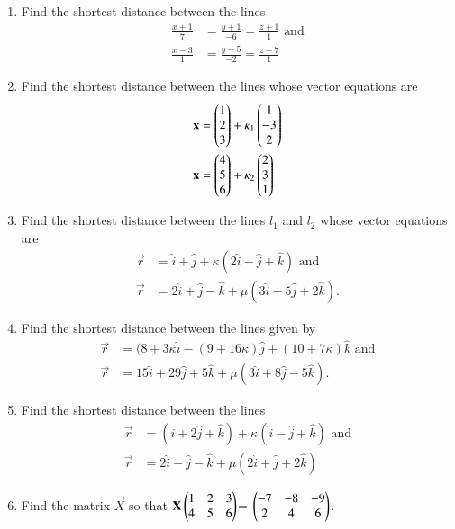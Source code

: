 \begin{enumerate}[label=\thesubsection.\arabic*,ref=\thesubsection.\theenumi]
\item Find the shortest distance between the lines
\begin{align}
	\frac{x+1}{7}&=\frac{y+1}{-6}=\frac{z+1}{1} \text{ and}
	\\
	\frac{x-3}{1}&=\frac{y-5}{-2}=\frac{z-7}{1}
\end{align}
    \solution
		
    \item Find the shortest distance between the lines whose vector equations are
    \begin{align}
\begin{split}
	\mathbf{x} &= \begin{pmatrix}1\\2\\3\end{pmatrix} + \kappa_1\begin{pmatrix}1\\-3\\2\end{pmatrix}
	\\
	\mathbf{x} &= \begin{pmatrix}4\\5\\6\end{pmatrix} + \kappa_2\begin{pmatrix}2\\3\\1\end{pmatrix}
\end{split}
        \label{eq:chapters/12/11/2/16/L2/svd}
    \end{align}
    \solution
		
\item Find the shortest distance between the lines $l_1$ and $l_2$ whose vector equations are 
\begin{align}
	\overrightarrow{r} &= \hat{i}+\hat{j}+\kappa(2\hat{i}-\hat{j}+\hat{k}) \text{ and}
	\\
	\overrightarrow{r} &= 2\hat{i}+\hat{j}-\hat{k}+\mu(3\hat{i}-5\hat{j}+2\hat{k}).
\end{align}
    \solution
		
\item Find the shortest distance between the lines given by 
\begin{align}
	\overrightarrow{r}&=(8+3\kappa\hat{i}-(9+16\kappa)\hat{j}+(10+7\kappa)\hat{k} \text{ and} 
	\\
	\overrightarrow{r}&=15\hat{i}+29\hat{j}+5\hat{k}+\mu(3\hat{i}+8\hat{j}-5\hat{k}).
\end{align}
\item Find the shortest distance between the lines
\begin{align}
	\overrightarrow{r}&=(\hat{i}+2\hat{j}+\hat{k})+\kappa(\hat{i}-\hat{j}+\hat{k}) \text{ and} 
	\\
	\overrightarrow{r}&=2\hat{i}-\hat{j}-\hat{k}+\mu(2\hat{i}+\hat{j}+2\hat{k})
\end{align}
\item Find the matrix $\vec{X}$ so that $\mathbf{X}\begin{pmatrix}1&2&3\\ 4&5&6\end{pmatrix}$= $\begin{pmatrix}-7&-8&-9\\ 2&4&6\end{pmatrix}$.
\end{enumerate}
